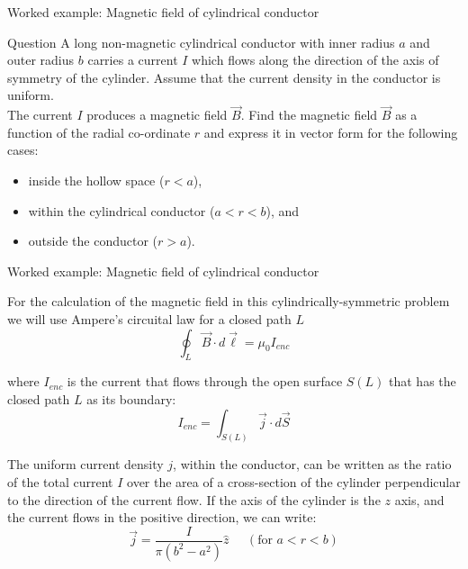 {
\problemslide

%
%
%

\begin{frame}{Worked example: Magnetic field of cylindrical conductor}

  \begin{blockexmplque}{Question}
    A long non-magnetic cylindrical conductor with inner radius $a$
    and outer radius $b$ carries a current $I$ which flows along the
    direction of the axis of symmetry of the cylinder.
    Assume that the current density in the conductor is uniform.\\
    \vspace{0.2cm}
    The current $I$ produces a magnetic field $\vec{B}$.
    Find the magnetic field $\vec{B}$ as a function of the radial
    co-ordinate $r$ and express it in vector form for the following cases:\\
    \vspace{0.2cm}
    \begin{itemize}
       \item inside the hollow space ($r < a$),
       \item within the cylindrical conductor ($a < r < b$), and
       \item outside the conductor ($r > a$).
     \end{itemize}
  \end{blockexmplque}

\end{frame}

%
%
%

\begin{frame}{Worked example: Magnetic field of cylindrical conductor}

  For the calculation of the magnetic field in this cylindrically-symmetric
  problem we will use Ampere's circuital law for a closed path $L$
  \begin{equation*}
     \oint_{L} \vec{B} \cdot d\vec{\ell} = \mu_0 I_{enc}
  \end{equation*}

  where $I_{enc}$ is the current that flows through the open surface $S(L)$
  that has the closed path $L$ as its boundary:
  \begin{equation*}
     I_{enc} = \int_{S(L)} \vec{j} \cdot d\vec{S}
  \end{equation*}

  The uniform current density $j$, within the conductor,
  can be written as the ratio of the
  total current $I$ over the area of a cross-section of the cylinder
  perpendicular to the direction of the current flow.
  If the axis of the cylinder is the $z$ axis, and the current flows
  in the positive direction, we can write:
  \begin{equation*}
     \vec{j} = \frac{I}{\pi(b^2-a^2)} \hat{z} \;\;\;\;\; (\text{for } a < r < b)
  \end{equation*}


\end{frame}}

